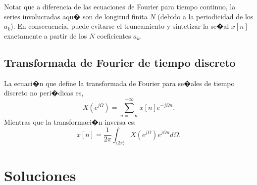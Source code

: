 \documentclass[10pt,a4paper]{article}
\begin{document}
Notar que a diferencia de las ecuaciones de Fourier para tiempo continuo, la series involucradas aqu� son de longitud 
finita $N$ (debido a la periodicidad de los $a_k$). En consecuencia, puede evitarse el truncamiento y sintetizar la 
se�al $x[n]$ exactamente a partir de los $N$ coeficientes $a_k$.

\subsection*{Transformada de Fourier de tiempo discreto}
La ecuaci�n que define la transformada de Fourier para se�ales de tiempo discreto no peri�dicas es,
\begin{equation}
X(e^{j\Omega}) = \sum_{n=-\infty}^{+\infty}x[n]e^{-j\Omega n}.
\end{equation}
Mientras que la transformaci�n inversa es:
\begin{equation}
x[n] = \frac{1}{2\pi} \int_{\langle 2\pi \rangle} X(e^{j\Omega})e^{j\Omega n} d\Omega.
\end{equation}

\section*{Soluciones}
\label{sec:sol}
\end{document}
